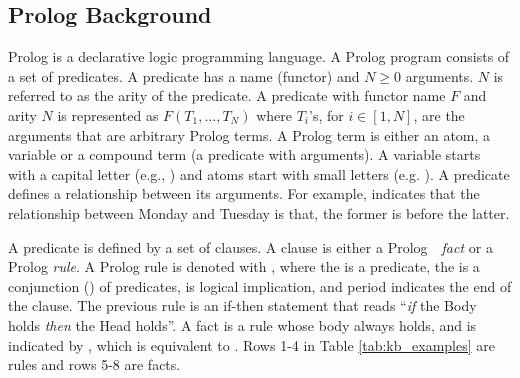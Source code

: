 

\subsection*{Prolog Background}
Prolog \cite{colmerauer1990introduction} is a declarative logic programming language. A Prolog program consists of a set of predicates. A predicate has a name (functor) and $N\geq0$ arguments. $N$ is referred to as the arity of the predicate. A predicate with functor name $F$ and arity $N$ is represented as $F(T_1, \dots, T_N)$ where $T_i$'s, for $i\in [1,N]$, are the arguments that are arbitrary Prolog terms. A Prolog term is either an atom, a variable or a compound term (a predicate with arguments). A variable starts with a capital letter (e.g., ) and atoms start with small letters (e.g. ). 
A predicate defines a relationship between its arguments. For example,  indicates that the relationship between Monday and Tuesday is that, the former is before the latter.

A predicate is defined by a set of clauses. A clause is either a Prolog~~\emph{fact} or a Prolog \emph{rule}. A Prolog rule is denoted with ,
where the  is a predicate, the  is a conjunction (\prologTerm{$\wedge$}) of predicates, \prologTerm{$\coloneq$} is logical implication, and period indicates the end of the clause. The previous rule is an if-then statement that reads ``\emph{if} the Body holds \emph{then} the Head holds''.
A fact is a rule whose body always holds, and is indicated by  
, which is equivalent to . Rows 1-4 in Table \ref{tab:kb_examples} are rules and rows 5-8 are facts.  

